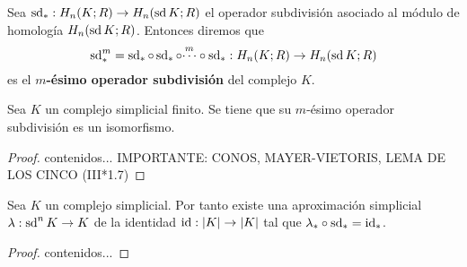\begin{definicion}
	Sea $\operatorname{sd}_*: H_n(K;R) \to H_n(\operatorname{sd} K;R)$ el operador subdivisión asociado al módulo de homología $H_n(\operatorname{sd} K;R)$. Entonces diremos que 
	\[
	\operatorname{sd}_*^m = \operatorname{sd}_* \circ \operatorname{sd}_* \circ \overset{m}{\cdots} \circ \operatorname{sd}_*: H_n(K;R) \to H_n(\operatorname{sd} K;R)
	\]
	es el \textbf{$m$-ésimo operador subdivisión} del complejo $K$.
\end{definicion}

\begin{proposicion}
	Sea $K$ un complejo simplicial finito. Se tiene que su $m$-ésimo operador subdivisión es un isomorfismo.
\end{proposicion}
\begin{proof}
	contenidos... IMPORTANTE: CONOS, MAYER-VIETORIS, LEMA DE LOS CINCO (III*1.7)
\end{proof}

\begin{proposicion}
	Sea $K$ un complejo simplicial. Por tanto existe una aproximación simplicial $\lambda: \operatorname{sd}^n K \to K$ de la identidad $\operatorname{id}: |K| \to |K|$ tal que $\lambda_* \circ \operatorname{sd}_* = \operatorname{id}_*$.
\end{proposicion}
\begin{proof}
	contenidos...
\end{proof}

\endinput
